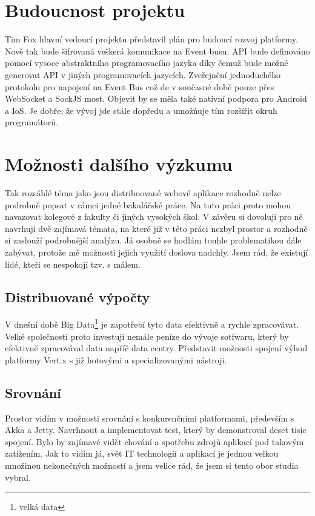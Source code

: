 \section{Budoucnost projektu}

Tim Fox hlavní vedoucí projektu představil plán\cite{plan} pro budoucí rozvoj platformy. Nově tak bude šifrovaná veškerá komunikace na Event busu. API bude definováno pomocí vysoce abstraktního programovacího jazyka díky čemuž bude možné generovat API v jiných programovacích jazycích. Zveřejnění jednoduchého protokolu pro napojení na Event Bus což de v současné době pouze přes WebSocket a SockJS most. Objevit by se měla také nativní podpora pro Android a IoS. Je dobře, že vývoj jde stále dopředu a umožňuje tím rozšířit okruh programátorů.

\section{Možnosti dalšího výzkumu}

Tak rozsáhlé téma jako jsou distribuované webové aplikace rozhodně nelze podrobně popsat v rámci jedné bakalářské práce. Na tuto práci proto mohou navazovat kolegové z fakulty či jiných vysokých škol. V závěru si dovoluji pro ně navrhuji dvě zajímavá témata, na které již v této práci nezbyl prostor a rozhodně si zaslouží podrobnější analýzu. Já osobně se hodlám touhle problematikou dále zabývat, protože mě možnosti jejich využití doslova nadchly. Jsem rád, že existují lidé, kteří se nespokojí tzv. s málem.
 
\subsection{Distribuované výpočty}

V dnešní době Big Data\footnote{velká data} je zapotřebí tyto data efektivně a rychle zpracovávat. Velké společnosti proto investují nemále peníze do vývoje sotfwaru, který by efektivně zpracovával data napříč data centry. Představit možnosti spojení výhod platformy Vert.x s již hotovými a specializovanými nástroji.

\subsection{Srovnání}

Prostor vidím v možnosti srovnání s konkurenčními platformami, především s Akka a Jetty. Navrhnout a implementovat test, který by demonstroval deset tisíc spojení. Bylo by zajímavé vidět chování a spotřebu zdrojů aplikací pod takovým zatížením. Jak to vidím já, svět IT technologií a aplikací je jednou velkou množinou nekonečných možností a jsem velice rád, že jsem si tento obor studia vybral.